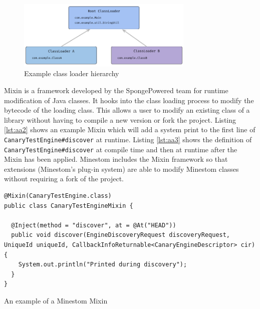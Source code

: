 \documentclass[12pt]{article}
\def\code#1{\texttt{#1}}
\begin{document}
\begin{onehalfspacing}
\begin{figure}[H] 
    \centering
    \includegraphics[width=0.75\textwidth]{media/media/image1.png} 
    \caption{Example class loader hierarchy} 
    \label{fig:aa1}  
\end{figure}


Mixin is a framework developed by the SpongePowered team for runtime
modification of Java classes. It hooks into the class loading process to
modify the bytecode of the loading class. This allows a user to modify
an existing class of a library without having to compile a new version
or fork the project. Listing \ref{lst:aa2} shows an example Mixin which will add
a system print to the first line of \code{CanaryTestEngine\#discover} at
runtime. Listing \ref{lst:aa3} shows the definition of
\code{CanaryTestEngine\#discover} at compile time and then at runtime after
the Mixin has been applied. Minestom includes the Mixin framework so
that extensions (Minestom's plug-in system) are able to modify Minestom
classes without requiring a fork of the project.

\begin{listing}[H]
\begin{verbatim}
@Mixin(CanaryTestEngine.class)
public class CanaryTestEngineMixin {

  @Inject(method = "discover", at = @At("HEAD"))
  public void discover(EngineDiscoveryRequest discoveryRequest, UniqueId uniqueId, CallbackInfoReturnable<CanaryEngineDescriptor> cir) {
    System.out.println("Printed during discovery");
  }
}
\end{verbatim}
\caption{An example of a Minestom Mixin}
\label{lst:aa2}
\end{listing}





\end{onehalfspacing}
\end{document}
